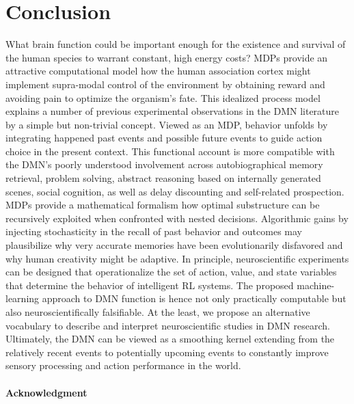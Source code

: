 \documentclass{article} %
\begin{document}
\section{Conclusion}
What brain function could be important enough
for the existence and survival of the human species
to warrant constant, high energy costs?
MDPs provide an attractive
computational model how the human association cortex
might implement supra-modal control of the environment by
obtaining reward and avoiding pain to
optimize the organism's fate.
This idealized process model explains
a number of previous experimental observations in the
DMN literature by a simple but non-trivial concept.
%
Viewed as an MDP, behavior unfolds by integrating happened past events
and possible future events to guide action choice in the present context.
This functional account is more compatible with the DMN's
poorly understood involvement across
autobiographical memory retrieval, problem solving,
abstract reasoning based on internally generated scenes, social cognition,
as well as delay discounting and self-related prospection.
MDPs provide a mathematical formalism how
optimal substructure can be recursively exploited
when confronted with nested decisions.
Algorithmic gains by injecting stochasticity in the recall of past
behavior and outcomes may plausibilize why
very accurate memories have been evolutionarily disfavored
and why human creativity might be adaptive.
%
In principle,
neuroscientific experiments can be designed that operationalize
the set of action, value, and state variables that determine
the behavior of intelligent RL systems.
The proposed machine-learning
approach to DMN function is hence not only practically computable but
also neuroscientifically falsifiable.
At the least, we propose an alternative vocabulary to
describe and interpret neuroscientific studies in DMN research.
%
Ultimately,
the DMN can be viewed as a smoothing kernel extending
from the relatively recent events to potentially upcoming events
to constantly improve sensory processing and
action performance in the world.



\paragraph{Acknowledgment}


\small


\end{document}
